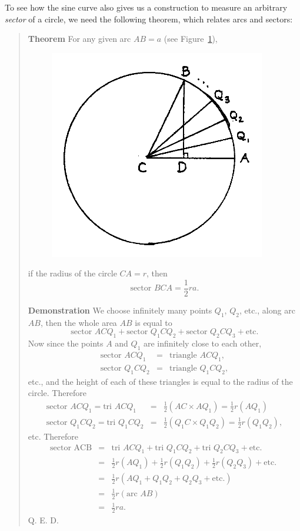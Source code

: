 \documentclass[polutonikogreek,english,twoside,openright]{article}
\newlength{\oldjot}
\begin{document}
To see how the sine curve also gives us a construction to measure an
arbitrary {\em sector} of a circle, we need the following theorem,
which relates arcs and sectors:
\begin{quote} {\bf Theorem} \hspace{1ex}\label{secarea} For any given
  arc $AB =a$ (see Figure~\ref{sector}),
  \begin{figure}[htp]
    \begin{center}
      \includegraphics[width=.5\textwidth]{fig/Figure59}
      \caption{}
      \label{sector}
      \vspace{-10pt}
    \end{center}
  \end{figure}
  if the radius of the circle $CA =r$, then
$$\mbox{sector }BCA = \frac{1}{2}ra.$$

{\bf Demonstration} \hspace{1ex} We choose infinitely many points
$Q_1$, $Q_2$, etc., along arc $AB$, then the whole area $AB$ is equal
to
$$\mbox{sector }ACQ_1 + \mbox{sector }Q_1CQ_2 + \mbox{sector }Q_2CQ_3 + \mbox{etc.}$$
Now since the points $A$ and $Q_1$ are infinitely close to each other,
\begin{eqnarray*}
  \mbox{sector }ACQ_1 & = & \mbox{triangle }ACQ_1,\\
  \mbox{sector }Q_1CQ_2 & = & \mbox{triangle }Q_1CQ_2,
\end{eqnarray*}
etc., and the height of each of these triangles is equal to the radius
of the circle.  Therefore \setlength{\jot}{1.5ex}
\begin{eqnarray*}
  \mbox{sector }ACQ_1 = \mbox{tri }ACQ_1 & = & \frac{1}{2}(AC \times AQ_1) = \frac{1}{2}r(AQ_1)\\
  \mbox{sector }Q_1CQ_2 = \mbox{tri }Q_1CQ_2 & = & \frac{1}{2}(Q_1C \times Q_1Q_2) = \frac{1}{2}r(Q_1Q_2),
\end{eqnarray*}
etc.  Therefore
\begin{eqnarray*}
  \mbox{sector ACB} & = & \mbox{tri }ACQ_1 + \mbox{tri }Q_1CQ_2 + \mbox{tri }Q_2CQ_3 + \mbox{etc.}\\
                    & = & \frac{1}{2}r(AQ_1) + \frac{1}{2}r(Q_1Q_2) + \frac{1}{2}r(Q_2Q_3) + \mbox{etc. }\\
                    & = & \frac{1}{2}r(AQ_1 + Q_1Q_2 + Q_2Q_3 + \mbox{etc.})\\
                    & = & \frac{1}{2}r(\mbox{arc }AB)\\
                    & = & \frac{1}{2}ra.
\end{eqnarray*}
\setlength{\jot}{\oldjot} Q. E. D.
\end{quote}
\end{document}
